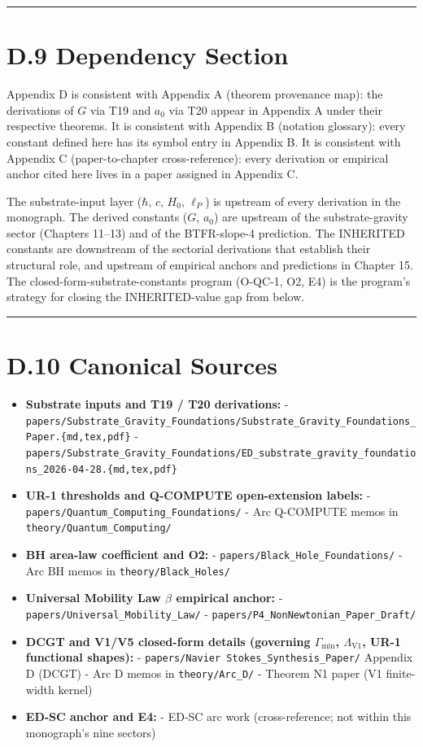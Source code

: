 \documentclass[11pt]{book}
\begin{document}
\bigskip\hrule\bigskip

\section{D.9 Dependency Section}

Appendix D is consistent with Appendix A (theorem provenance map): the derivations of $G$ via T19 and $a_0$ via T20 appear in Appendix A under their respective theorems. It is consistent with Appendix B (notation glossary): every constant defined here has its symbol entry in Appendix B. It is consistent with Appendix C (paper-to-chapter cross-reference): every derivation or empirical anchor cited here lives in a paper assigned in Appendix C.

The substrate-input layer ($\hbar$, $c$, $H_0$, $\ell_P$) is upstream of every derivation in the monograph. The derived constants ($G$, $a_0$) are upstream of the substrate-gravity sector (Chapters 11–13) and of the BTFR-slope-4 prediction. The INHERITED constants are downstream of the sectorial derivations that establish their structural role, and upstream of empirical anchors and predictions in Chapter 15. The closed-form-substrate-constants program (O-QC-1, O2, E4) is the program's strategy for closing the INHERITED-value gap from below.

\bigskip\hrule\bigskip

\section{D.10 Canonical Sources}

\begin{itemize}
\item \textbf{Substrate inputs and T19 / T20 derivations:}
  - \texttt{papers/Substrate\_Gravity\_Foundations/Substrate\_Gravity\_Foundations\_Paper.\{md,tex,pdf\}}
  - \texttt{papers/Substrate\_Gravity\_Foundations/ED\_substrate\_gravity\_foundations\_2026-04-28.\{md,tex,pdf\}}
\item \textbf{UR-1 thresholds and Q-COMPUTE open-extension labels:}
  - \texttt{papers/Quantum\_Computing\_Foundations/}
  - Arc Q-COMPUTE memos in \texttt{theory/Quantum\_Computing/}
\item \textbf{BH area-law coefficient and O2:}
  - \texttt{papers/Black\_Hole\_Foundations/}
  - Arc BH memos in \texttt{theory/Black\_Holes/}
\item \textbf{Universal Mobility Law $\beta$ empirical anchor:}
  - \texttt{papers/Universal\_Mobility\_Law/}
  - \texttt{papers/P4\_NonNewtonian\_Paper\_Draft/}
\item \textbf{DCGT and V1/V5 closed-form details (governing $\Gamma_\mathrm{min}$, $\Lambda_\mathrm{V1}$, UR-1 functional shapes):}
  - \texttt{papers/Navier Stokes\_Synthesis\_Paper/} Appendix D (DCGT)
  - Arc D memos in \texttt{theory/Arc\_D/}
  - Theorem N1 paper (V1 finite-width kernel)
\item \textbf{ED-SC anchor and E4:}
  - ED-SC arc work (cross-reference; not within this monograph's nine sectors)
\end{itemize}
\end{document}
